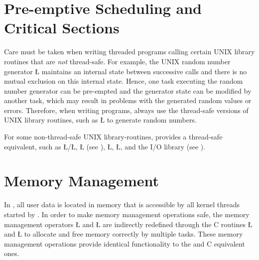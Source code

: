 \documentclass[openright,twoside]{report}
\begin{document}
\section{Pre-emptive Scheduling and Critical Sections}

Care must be taken when writing threaded programs calling certain UNIX library routines that are \emph{not} thread-safe.
For example, the UNIX random number generator \LGinlinetrue\LGbegin\lgrinde\L{}\endlgrinde\LGend{} maintains an internal state between successive calls and there is no mutual exclusion on this internal state.
Hence, one task executing the random number generator can be pre-empted and the generator state can be modified by another task, which may result in problems with the generated random values or errors.
Therefore, when writing \uC programs, always use the thread-safe versions of UNIX library routines, such as \LGinlinetrue\LGbegin\lgrinde\L{}\endlgrinde\LGend{} to generate random numbers.

For some non-thread-safe UNIX library-routines, \uC provides a thread-safe equivalent, such as \LGinlinetrue\LGbegin\lgrinde\L{}\endlgrinde\LGend{}/\LGinlinetrue\LGbegin\lgrinde\L{}\endlgrinde\LGend{}, \LGinlinetrue\LGbegin\lgrinde\L{}\endlgrinde\LGend{} (see ), \LGinlinetrue\LGbegin\lgrinde\L{}\endlgrinde\LGend{}, \LGinlinetrue\LGbegin\lgrinde\L{}\endlgrinde\LGend{}, and the \uC I/O library (see ).


\section{Memory Management}
\label{s:MemoryManagement}

In \uC, all user data is located in memory that is accessible by all kernel threads started by \uC.
In order to make memory management operations safe, the \CC memory management operators \LGinlinetrue\LGbegin\lgrinde\L{}\endlgrinde\LGend{} and \LGinlinetrue\LGbegin\lgrinde\L{}\endlgrinde\LGend{} are indirectly redefined through the C routines \LGinlinetrue\LGbegin\lgrinde\L{}\endlgrinde\LGend{} and \LGinlinetrue\LGbegin\lgrinde\L{}\endlgrinde\LGend{} to allocate and free memory correctly by multiple tasks.
These memory management operations provide identical functionality to the \CC and C equivalent ones.
\end{document}
